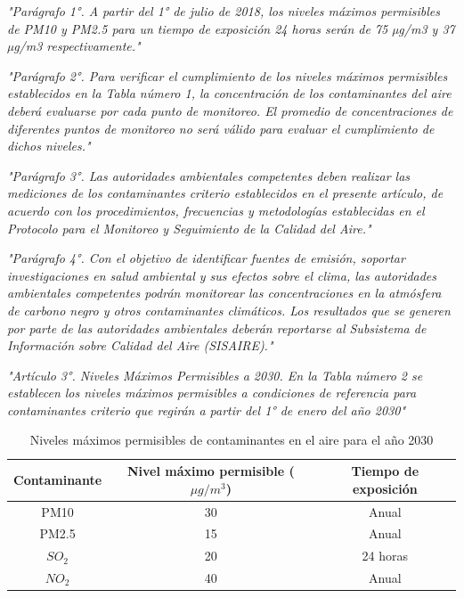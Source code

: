 \textit{"Parágrafo 1°. A partir del 1° de julio de 2018, los niveles máximos permisibles de PM10 y PM2.5 para un tiempo de exposición 24 horas serán de 75 µg/m3 y 37 µg/m3 respectivamente."}

\textit{"Parágrafo 2°. Para verificar el cumplimiento de los niveles máximos permisibles establecidos en la Tabla número 1, la concentración de los contaminantes del aire deberá evaluarse por cada punto de monitoreo. El promedio de concentraciones de diferentes puntos de monitoreo no será válido para evaluar el cumplimiento de dichos niveles."}

\textit{"Parágrafo 3°. Las autoridades ambientales competentes deben realizar las mediciones de los contaminantes criterio establecidos en el presente artículo, de acuerdo con los procedimientos, frecuencias y metodologías establecidas en el Protocolo para el Monitoreo y Seguimiento de la Calidad del Aire."}

\textit{"Parágrafo 4°. Con el objetivo de identificar fuentes de emisión, soportar investigaciones en salud ambiental y sus efectos sobre el clima, las autoridades ambientales competentes podrán monitorear las concentraciones en la atmósfera de carbono negro y otros contaminantes climáticos. Los resultados que se generen por parte de las autoridades ambientales deberán reportarse al Subsistema de Información sobre Calidad del Aire (SISAIRE)."}

\textit{"Artículo 3°. Niveles Máximos Permisibles a 2030. En la Tabla número 2 se establecen los niveles máximos permisibles a condiciones de referencia para contaminantes criterio que regirán a partir del 1° de enero del año 2030"}

\begin{table}[h!]
	\begin{center}
		\begin{tabular}{| c | c | c |}
			\hline
			\rowcolor{lightgray}
			Contaminante 	& Nivel máximo permisible ($ \mu g/m^3 $) 	& Tiempo de exposición	\\ \hline
			PM10			& 30 		& Anual		\\ \hline
			PM2.5 			& 15 		& Anual 	\\ \hline
			$ SO_2 $		& 20 		& 24 horas 	\\ \hline
			$ NO_2 $		& 40 		& Anual 	\\ \hline
		\end{tabular}
		\caption{Niveles máximos permisibles de contaminantes en el aire para el año 2030}
	\end{center}
\end{table}


